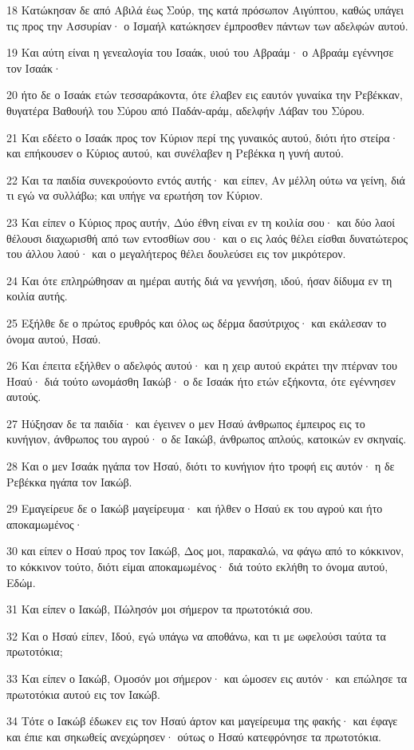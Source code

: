 \par 18 Κατώκησαν δε από Αβιλά έως Σούρ, της κατά πρόσωπον Αιγύπτου, καθώς υπάγει τις προς την Ασσυρίαν· ο Ισμαήλ κατώκησεν έμπροσθεν πάντων των αδελφών αυτού.
\par 19 Και αύτη είναι η γενεαλογία του Ισαάκ, υιού του Αβραάμ· ο Αβραάμ εγέννησε τον Ισαάκ·
\par 20 ήτο δε ο Ισαάκ ετών τεσσαράκοντα, ότε έλαβεν εις εαυτόν γυναίκα την Ρεβέκκαν, θυγατέρα Βαθουήλ του Σύρου από Παδάν-αράμ, αδελφήν Λάβαν του Σύρου.
\par 21 Και εδέετο ο Ισαάκ προς τον Κύριον περί της γυναικός αυτού, διότι ήτο στείρα· και επήκουσεν ο Κύριος αυτού, και συνέλαβεν η Ρεβέκκα η γυνή αυτού.
\par 22 Και τα παιδία συνεκρούοντο εντός αυτής· και είπεν, Αν μέλλη ούτω να γείνη, διά τι εγώ να συλλάβω; και υπήγε να ερωτήση τον Κύριον.
\par 23 Και είπεν ο Κύριος προς αυτήν, Δύο έθνη είναι εν τη κοιλία σου· και δύο λαοί θέλουσι διαχωρισθή από των εντοσθίων σου· και ο εις λαός θέλει είσθαι δυνατώτερος του άλλου λαού· και ο μεγαλήτερος θέλει δουλεύσει εις τον μικρότερον.
\par 24 Και ότε επληρώθησαν αι ημέραι αυτής διά να γεννήση, ιδού, ήσαν δίδυμα εν τη κοιλία αυτής.
\par 25 Εξήλθε δε ο πρώτος ερυθρός και όλος ως δέρμα δασύτριχος· και εκάλεσαν το όνομα αυτού, Ησαύ.
\par 26 Και έπειτα εξήλθεν ο αδελφός αυτού· και η χειρ αυτού εκράτει την πτέρναν του Ησαύ· διά τούτο ωνομάσθη Ιακώβ· ο δε Ισαάκ ήτο ετών εξήκοντα, ότε εγέννησεν αυτούς.
\par 27 Ηύξησαν δε τα παιδία· και έγεινεν ο μεν Ησαύ άνθρωπος έμπειρος εις το κυνήγιον, άνθρωπος του αγρού· ο δε Ιακώβ, άνθρωπος απλούς, κατοικών εν σκηναίς.
\par 28 Και ο μεν Ισαάκ ηγάπα τον Ησαύ, διότι το κυνήγιον ήτο τροφή εις αυτόν· η δε Ρεβέκκα ηγάπα τον Ιακώβ.
\par 29 Εμαγείρευε δε ο Ιακώβ μαγείρευμα· και ήλθεν ο Ησαύ εκ του αγρού και ήτο αποκαμωμένος·
\par 30 και είπεν ο Ησαύ προς τον Ιακώβ, Δος μοι, παρακαλώ, να φάγω από το κόκκινον, το κόκκινον τούτο, διότι είμαι αποκαμωμένος· διά τούτο εκλήθη το όνομα αυτού, Εδώμ.
\par 31 Και είπεν ο Ιακώβ, Πώλησόν μοι σήμερον τα πρωτοτόκιά σου.
\par 32 Και ο Ησαύ είπεν, Ιδού, εγώ υπάγω να αποθάνω, και τι με ωφελούσι ταύτα τα πρωτοτόκια;
\par 33 Και είπεν ο Ιακώβ, Ομοσόν μοι σήμερον· και ώμοσεν εις αυτόν· και επώλησε τα πρωτοτόκια αυτού εις τον Ιακώβ.
\par 34 Τότε ο Ιακώβ έδωκεν εις τον Ησαύ άρτον και μαγείρευμα της φακής· και έφαγε και έπιε και σηκωθείς ανεχώρησεν· ούτως ο Ησαύ κατεφρόνησε τα πρωτοτόκια.

